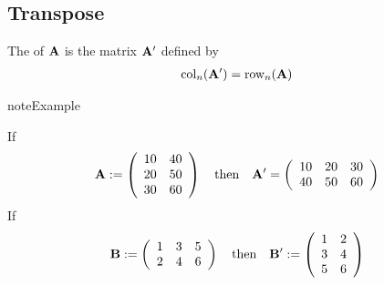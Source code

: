 \documentclass[letterpaper,10pt,english]{jupyterBook}
\begin{document}
\subsection{Transpose}
\label{\detokenize{05.linear_algebra:transpose}}
\sphinxAtStartPar
The  of \({\bf A}\) is the matrix \({\bf A}'\) defined by
\begin{equation*}
\begin{split}\mathrm{col}_n({\bf A}') = \mathrm{row}_n({\bf A})\end{split}
\end{equation*}
\begin{sphinxadmonition}{note}{Example}

\sphinxAtStartPar
If
\begin{equation}\label{equation:05.linear_algebra:eq:aandb}
\begin{split}
%
{\bf A} := 
\left(
\begin{array}{cc}
10 & 40 \\
20 & 50 \\
30 & 60
\end{array}
\right)
\quad \text{then} \quad
{\bf A}' = 
\left(
\begin{array}{ccc}
10 & 20 & 30 \\
40 & 50 & 60 
\end{array}
\right)
%
\end{split}
\end{equation}
\sphinxAtStartPar
If
\begin{equation*}
\begin{split}
%
{\bf B} := 
\left(
\begin{array}{ccc}
1 & 3 & 5 \\
2 & 4 & 6 \\
\end{array}
\right)
\quad \text{then} \quad
{\bf B}' := 
\left(
\begin{array}{cc}
1 & 2 \\
3 & 4 \\
5 & 6 
\end{array}
\right)
%
\end{split}
\end{equation*}\end{sphinxadmonition}
\end{document}
